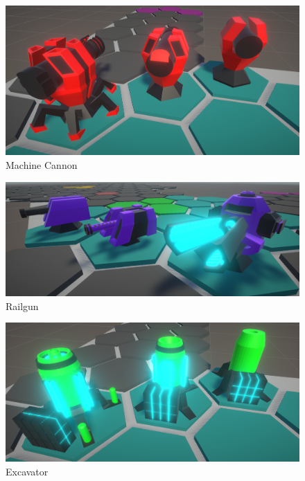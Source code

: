 \documentclass[12pt, a4paper]{article}
\begin{document}
	\begin{figure}[H]
		\centering
		\includegraphics[width=1\textwidth]{machineCannon.png}
		\caption{Machine Cannon}
		\label{fig: machineCannon}
	\end{figure}
	
	\begin{figure}[H]
		\centering
		\includegraphics[width=1\textwidth]{railgun.png}
		\caption{Railgun}
		\label{fig: railgun}
	\end{figure}

	\begin{figure}[H]
		\centering
		\includegraphics[width=1\textwidth]{excavator.png}
		\caption{Excavator}
		\label{fig: excavator}
	\end{figure}
	
\end{document}
